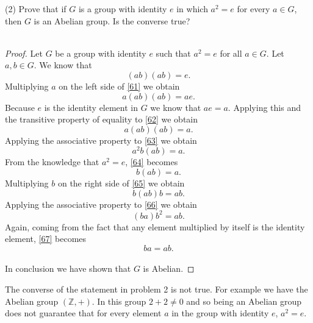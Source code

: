 \documentclass[11pt,a4paper]{article}
\begin{document}
(2) Prove that if $G$ is a group with identity $e$ in which $a^2 = e$ for every $a \in G$, then $G$ is an Abelian group. Is the converse true?\\
~\\
\begin{proof}
Let $G$ be a group with identity $e$ such that $a^2 = e$ for all $a\in G$. Let $a,b\in G$. We know that
\begin{equation}\label{61}
(ab)(ab) = e.
\end{equation}
Multiplying $a$ on the left side of \eqref{61} we obtain
\begin{equation}\label{62}
a(ab)(ab) = ae.
\end{equation}
Because $e$ is the identity element in $G$ we know that $ae = a$. Applying this and the transitive property of equality to \eqref{62} we obtain
\begin{equation}\label{63}
a(ab)(ab) = a.
\end{equation}
Applying the associative property to \eqref{63} we obtain
\begin{equation}\label{64}
a^2b(ab) = a.
\end{equation}
From the knowledge that $a^2= e$, \eqref{64} becomes
\begin{equation}\label{65}
b(ab) = a.
\end{equation}
Multiplying $b$ on the right side of \eqref{65} we obtain
\begin{equation}\label{66}
b(ab)b = ab.
\end{equation}
Applying the associative property to \eqref{66} we obtain
\begin{equation}\label{67}
(ba)b^2 = ab.
\end{equation}
Again, coming from the fact that any element multiplied by itself is the identity element, \eqref{67} becomes
\[ba = ab.\]
~\\
In conclusion we have shown that $G$ is Abelian.
\end{proof}

The converse of the statement in problem 2 is not true. For example we have the Abelian group $(\mathbb{Z},+)$. In this group $2+2 \neq 0$ and so being an Abelian group does not guarantee that for every element $a$ in the group with identity $e$, $a^2 = e$.
\end{document}

